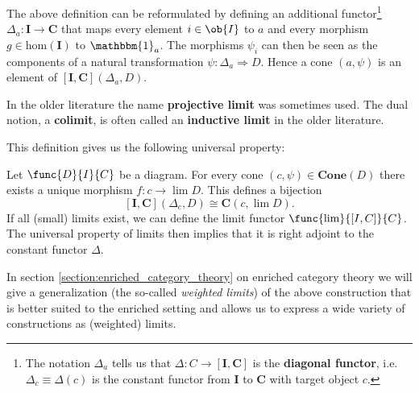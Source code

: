     \begin{adefinition}
        The above definition can be reformulated by defining an additional functor\footnote{The notation $\Delta_a$ tells us that $\Delta:C\rightarrow [\mathbf{I},\mathbf{C}]$ is the \textbf{diagonal functor}, i.e. $\Delta_c\equiv\Delta(c)$ is the constant functor from $\mathbf{I}$ to $\mathbf{C}$ with target object $c$.} $\Delta_a:\mathbf{I}\rightarrow\mathbf{C}$ that maps every element $i\in\ob{I}$ to $a$ and every morphism $g\in\text{hom}(\mathbf{I})$ to $\mathbbm{1}_a$. The morphisms $\psi_i$ can then be seen as the components of a natural transformation $\psi:\Delta_a\Rightarrow D$. Hence a cone $(a,\psi)$ is an element of $[\mathbf{I}, \mathbf{C}](\Delta_a, D)$.
    \end{adefinition}

    \begin{remark*}
        In the older literature the name \textbf{projective limit} was sometimes used. The dual notion, a \textbf{colimit}, is often called an \textbf{inductive limit} in the older literature.
    \end{remark*}
    This definition gives us the following universal property:
    \begin{uproperty}\label{cat:limit_uproperty}
        Let $\func{D}{I}{C}$ be a diagram. For every cone $(c,\psi)\in\mathbf{Cone}(D)$ there exists a unique morphism $f:c\rightarrow\lim D$. This defines a bijection \[[\mathbf{I}, \mathbf{C}](\Delta_c, D) \cong \mathbf{C}(c, \lim D).\]
        If all (small) limits exist, we can define the limit functor $\func{\lim}{[I, C]}{C}$. The universal property of limits then implies that it is right adjoint to the constant functor $\Delta$.
    \end{uproperty}
    \begin{remark}
        In section \ref{section:enriched_category_theory} on enriched category theory we will give a generalization (the so-called \textit{weighted limits}) of the above construction that is better suited to the enriched setting and allows us to express a wide variety of constructions as (weighted) limits.
    \end{remark}

